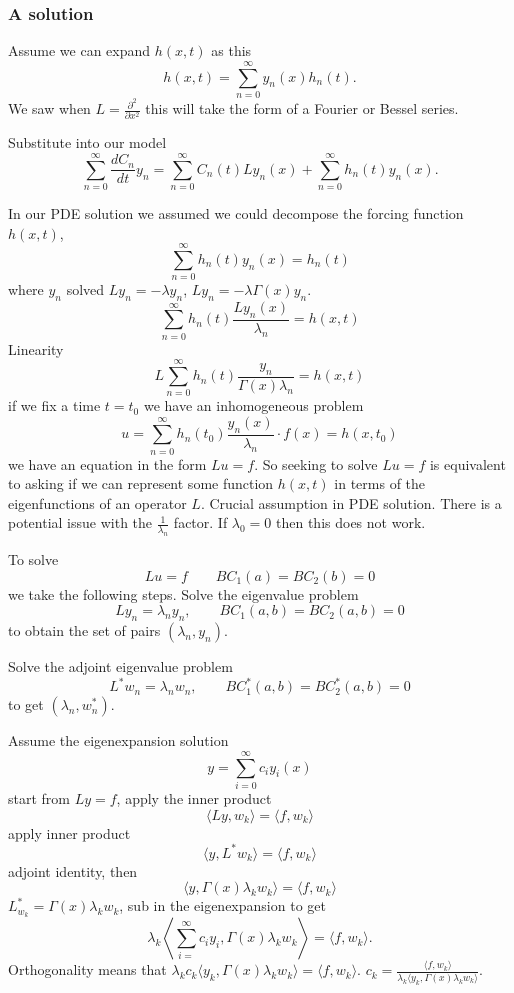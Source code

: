 \documentclass[10pt, a4paper]{article}
\begin{document}
\subsubsection{A solution}

Assume we can expand $h(x, t)$ as this
\[
h(x, t) = \sum_{n = 0}^{\infty}y_n(x)h_n(t).
\]
We saw when $L = \frac{\partial ^ 2}{\partial x ^ 2}$ this will take the form of a Fourier or Bessel series.

Substitute into our model
\[
\sum_{n = 0}^{\infty}\frac{dC_n}{dt}y_n = \sum_{n = 0}^{\infty}C_n(t)Ly_n(x) + \sum_{n = 0}^{\infty}h_n(t)y_n(x).
\]

In our PDE solution we assumed we could decompose the forcing function $h(x, t)$,
\[
\sum_{n = 0}^{\infty}h_n(t)y_n(x) = h_n(t)
\]
where $y_n$ solved $Ly_n = -\lambda y_n$,
$Ly_n = -\lambda \Gamma(x)y_n$.
\[
\sum_{n = 0}^{\infty}h_n(t)\frac{Ly_n(x)}{\lambda_n} = h(x, t)
\]
Linearity
\[
L\sum_{n = 0}^{\infty}h_n(t)\frac{y_n}{\Gamma(x)\lambda_n} = h(x, t)
\]
if we fix a time $t = t_0$ we have an inhomogeneous problem
\[
u = \sum_{n = 0}^{\infty}h_n(t_0)\frac{y_n(x)}{\lambda_n}\cdot f(x) = h(x, t_0)
\]
we have an equation in the form $Lu = f$.
So seeking to solve $Lu = f$ is equivalent to asking if we can represent some function $h(x, t)$ in terms of the eigenfunctions of an operator $L$.
Crucial assumption in PDE solution.
There is a potential issue with the $\frac{1}{\lambda_n}$ factor.
If $\lambda_0 = 0$ then this does not work.

To solve
\[
Lu = f\qquad BC_1(a) = BC_2(b) = 0
\]
we take the following steps.
Solve the eigenvalue problem 
\[
Ly_n = \lambda_ny_n,\qquad BC_1(a, b) = BC_2(a, b) = 0
\]
to obtain the set of pairs $(\lambda_n, y_n)$.

Solve the adjoint eigenvalue problem
\[
L ^ {*}w_n = \lambda_nw_n,\qquad BC_1 ^ {*}(a, b) = BC_2 ^ {*}(a, b) = 0
\]
to get $(\lambda_n, w_n ^ {*})$.

Assume the eigenexpansion solution
\[
y = \sum_{i = 0}^{\infty}c_iy_i(x)
\]
start from $Ly = f$,
apply the inner product
\[
\langle Ly, w_k\rangle = \langle f, w_k\rangle
\]
apply inner product
\[
\langle y, L ^ {*}w_k\rangle = \langle f, w_k\rangle
\]
adjoint identity,
then
\[
\langle y, \Gamma(x)\lambda_kw_k\rangle = \langle f, w_k\rangle
\]
$L_{w_k}^{*} = \Gamma(x)\lambda_kw_k$,
sub in the eigenexpansion to get
\[
\lambda_k\left\langle\sum_{i = }^{\infty}c_iy_i, \Gamma(x)\lambda_kw_k\right\rangle = \langle f, w_k\rangle.
\]
Orthogonality means that $\lambda_kc_k\langle y_k, \Gamma(x)\lambda_kw_k\rangle = \langle f, w_k\rangle$.
$c_k = \frac{\langle f, w_k\rangle}{\lambda_k\langle y_k, \Gamma(x)\lambda_kw_k\rangle}$.
\end{document}
